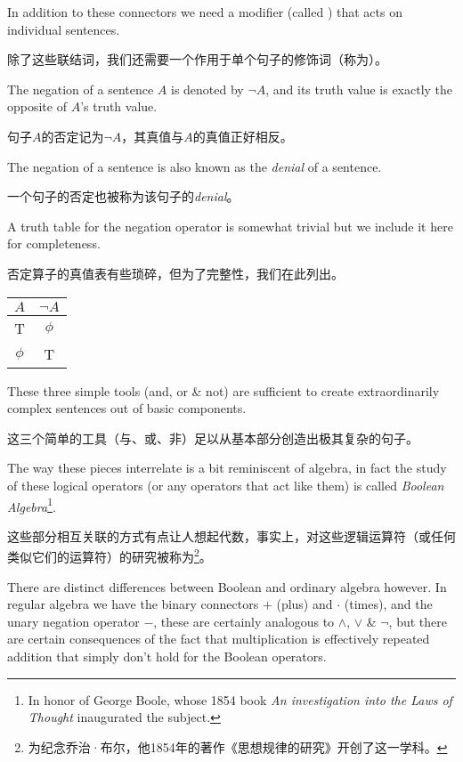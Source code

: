 In addition to these connectors we need a modifier (called 
) 
that acts on individual sentences.

除了这些联结词，我们还需要一个作用于单个句子的修饰词（称为）。

The negation of a sentence $A$ is 
denoted by ${\lnot}A$, and its truth value is exactly the opposite of
$A$'s truth value.

句子$A$的否定记为${\lnot}A$，其真值与$A$的真值正好相反。

The negation of a sentence is also known as the
\emph{denial} of a sentence.

一个句子的否定也被称为该句子的\emph{denial}。

A truth table for the negation operator is somewhat 
trivial but we include it here for completeness.

否定算子的真值表有些琐碎，但为了完整性，我们在此列出。

\begin{center}
\begin{tabular}{c||c}
\; $A$ \; &  \; ${\lnot}A$ \; \\ \hline
 T & $\phi$ \\
 $\phi$ & T \\
\end{tabular}
\end{center}

These three simple tools (and, or \& not) are sufficient to 
create extraordinarily complex sentences out of basic components.

这三个简单的工具（与、或、非）足以从基本部分创造出极其复杂的句子。

The way these pieces interrelate is a bit reminiscent of algebra,
in fact the study of these logical operators (or any
 operators that act like them) is called 
 {\em Boolean Algebra}\footnote{In honor of George Boole, whose 1854 %
 book {\em An investigation into the Laws of Thought} inaugurated the %
 subject. }.

这些部分相互关联的方式有点让人想起代数，事实上，对这些逻辑运算符（或任何类似它们的运算符）的研究被称为\footnote{为纪念乔治·布尔，他1854年的著作《思想规律的研究》开创了这一学科。}。

There are distinct differences
between Boolean and ordinary algebra however.  In regular algebra we have
the binary connectors $+$ (plus) and $\cdot$ (times), and the unary 
negation operator $-$, these are certainly analogous to $\land$, $\lor$ \&
$\lnot$, but there are certain consequences of the fact that multiplication
is effectively repeated addition that simply don't hold for the Boolean
operators.

